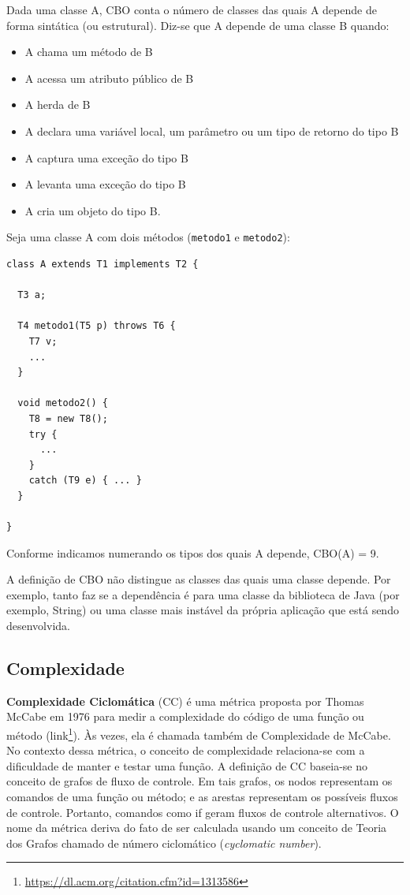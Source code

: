 \documentclass[
  11pt,
  twoside]{book}
\newcommand{\passthrough}[1]{#1}
\DeclareRobustCommand{\href}[2]{#2\footnote{\url{#1}}}
\begin{document}
Dada uma classe A, CBO conta o número de classes das quais A depende de
forma sintática (ou estrutural). Diz-se que A depende de uma classe B
quando:

\begin{itemize}
\item
  A chama um método de B
\item
  A acessa um atributo público de B
\item
  A herda de B
\item
  A declara uma variável local, um parâmetro ou um tipo de retorno do
  tipo B
\item
  A captura uma exceção do tipo B
\item
  A levanta uma exceção do tipo B
\item
  A cria um objeto do tipo B.
\end{itemize}

Seja uma classe A com dois métodos (\passthrough{\lstinline!metodo1!} e
\passthrough{\lstinline!metodo2!}):

\begin{lstlisting}
class A extends T1 implements T2 {

  T3 a;

  T4 metodo1(T5 p) throws T6 {
    T7 v;
    ...
  }

  void metodo2() {
    T8 = new T8();
    try {
      ...
    }
    catch (T9 e) { ... }
  }

}
\end{lstlisting}

Conforme indicamos numerando os tipos dos quais A depende, CBO(A) = 9.

A definição de CBO não distingue as classes das quais uma classe
depende. Por exemplo, tanto faz se a dependência é para uma classe da
biblioteca de Java (por exemplo, String) ou uma classe mais instável da
própria aplicação que está sendo desenvolvida.

\hypertarget{complexidade}{%
\subsection{Complexidade}\label{complexidade}}

 

\textbf{Complexidade Ciclomática} (CC) é uma métrica proposta por Thomas
McCabe em 1976 para medir a complexidade do código de uma função ou
método (\href{https://dl.acm.org/citation.cfm?id=1313586}{link}). Às
vezes, ela é chamada também de Complexidade de McCabe. No contexto dessa
métrica, o conceito de complexidade relaciona-se com a dificuldade de
manter e testar uma função. A definição de CC baseia-se no conceito de
grafos de fluxo de controle. Em tais grafos, os nodos representam os
comandos de uma função ou método; e as arestas representam os possíveis
fluxos de controle. Portanto, comandos como if geram fluxos de controle
alternativos. O nome da métrica deriva do fato de ser calculada usando
um conceito de Teoria dos Grafos chamado de número ciclomático
(\emph{cyclomatic number}).
\end{document}
